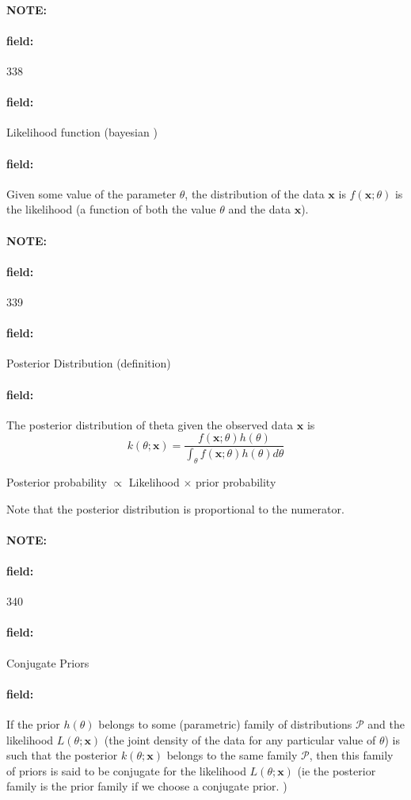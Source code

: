 \documentclass[12pt]{article}
\newenvironment{note}{\paragraph{NOTE:}}{}
\newenvironment{field}{\paragraph{field:}}{}
\begin{document}
\begin{note}
    \begin{field}
        \tiny 338
    \end{field}
    \begin{field}
        Likelihood function (bayesian )
    \end{field}
    \begin{field}
        Given some value of the parameter $\theta$, the distribution of the data $\mathbf{x}$ is $f(\mathbf{x};\theta)$ is the likelihood (a function of both the value $\theta$ and the data $\mathbf{x}$).
    \end{field}
\end{note}

\begin{note}
    \begin{field}
        \tiny 339
    \end{field}
    \begin{field}
        Posterior Distribution (definition)
    \end{field}
    \begin{field}
        The posterior distribution of theta given the observed data $\mathbf{x}$ is $$k(\theta;\mathbf{x}) = \frac{f(\mathbf{x};\theta)h(\theta)}{\int_\theta f(\mathbf{x};\theta)h(\theta)d\theta} $$

        Posterior probability $\propto$ Likelihood $\times$ prior probability

        Note that the posterior distribution is proportional to the numerator.
    \end{field}
\end{note}

\begin{note}
    \begin{field}
        \tiny 340
    \end{field}
    \begin{field}
        Conjugate Priors
    \end{field}
    \begin{field}
        If the prior $h(\theta)$ belongs to some (parametric) family of distributions $\mathscr{P}$ and the likelihood $L(\theta;\mathbf{x})$ (the joint density of the data for any particular value of $\theta$) is such that the posterior $k(\theta;\mathbf{x})$ belongs to the same family $\mathscr{P}$, then this family of priors is said to be conjugate for the likelihood $L(\theta;\mathbf{x})$ (ie the posterior family is the prior family if we choose a conjugate prior. )
    \end{field}
\end{note}
\end{document}
